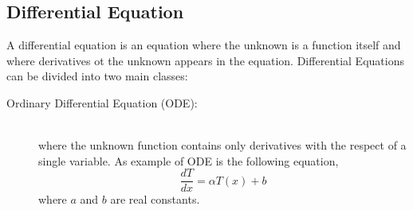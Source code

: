 \subsection{Differential Equation}
A differential equation\cite{Larsoon:2004,Mcowen:2002} is an equation where the unknown is a function itself and where derivatives ot the unknown appears in the equation.
Differential Equations can be divided into two main classes:
\begin{description}
\item[Ordinary Differential Equation (ODE):] \hfil \\ where the unknown function contains only derivatives with the respect of a single variable. As example of ODE is the following equation,
\[
  \frac{d T}{d x} = \alpha T(x) +b
\] where $a$ and $b$ are real constants.


\end{description}
